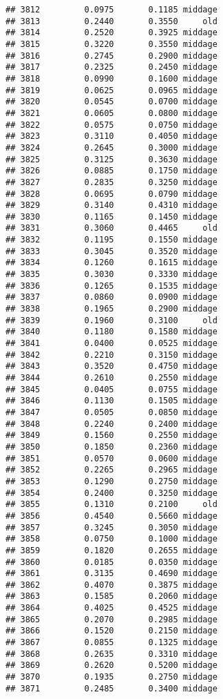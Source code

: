 \documentclass[
]{article}
\begin{document}
\begin{verbatim}
## 3812         0.0975       0.1185 middage
## 3813         0.2440       0.3550     old
## 3814         0.2520       0.3925 middage
## 3815         0.3220       0.3550 middage
## 3816         0.2745       0.2900 middage
## 3817         0.2325       0.2450 middage
## 3818         0.0990       0.1600 middage
## 3819         0.0625       0.0965 middage
## 3820         0.0545       0.0700 middage
## 3821         0.0605       0.0800 middage
## 3822         0.0575       0.0750 middage
## 3823         0.3110       0.4050 middage
## 3824         0.2645       0.3000 middage
## 3825         0.3125       0.3630 middage
## 3826         0.0885       0.1750 middage
## 3827         0.2835       0.3250 middage
## 3828         0.0695       0.0790 middage
## 3829         0.3140       0.4310 middage
## 3830         0.1165       0.1450 middage
## 3831         0.3060       0.4465     old
## 3832         0.1195       0.1550 middage
## 3833         0.3045       0.3520 middage
## 3834         0.1260       0.1615 middage
## 3835         0.3030       0.3330 middage
## 3836         0.1265       0.1535 middage
## 3837         0.0860       0.0900 middage
## 3838         0.1965       0.2900 middage
## 3839         0.1960       0.3100     old
## 3840         0.1180       0.1580 middage
## 3841         0.0400       0.0525 middage
## 3842         0.2210       0.3150 middage
## 3843         0.3520       0.4750 middage
## 3844         0.2610       0.2550 middage
## 3845         0.0405       0.0755 middage
## 3846         0.1130       0.1505 middage
## 3847         0.0505       0.0850 middage
## 3848         0.2240       0.2400 middage
## 3849         0.1560       0.2550 middage
## 3850         0.1850       0.2360 middage
## 3851         0.0570       0.0600 middage
## 3852         0.2265       0.2965 middage
## 3853         0.1290       0.2750 middage
## 3854         0.2400       0.3250 middage
## 3855         0.1310       0.2100     old
## 3856         0.4540       0.5660 middage
## 3857         0.3245       0.3050 middage
## 3858         0.0750       0.1000 middage
## 3859         0.1820       0.2655 middage
## 3860         0.0185       0.0350 middage
## 3861         0.3135       0.4690 middage
## 3862         0.4070       0.3875 middage
## 3863         0.1585       0.2060 middage
## 3864         0.4025       0.4525 middage
## 3865         0.2070       0.2985 middage
## 3866         0.1520       0.2150 middage
## 3867         0.0855       0.1325 middage
## 3868         0.2635       0.3310 middage
## 3869         0.2620       0.5200 middage
## 3870         0.1935       0.2750 middage
## 3871         0.2485       0.3400 middage

\end{verbatim}
\end{document}
